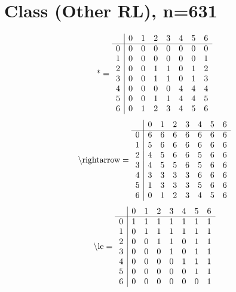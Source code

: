 \documentclass[11pt]{article}
\begin{document}
\section{Class (Other RL), n=631}
\[\text{*} = 
\begin{array}{r | r r r r r r r}
 & 0 & 1 & 2 & 3 & 4 & 5 & 6 \\ \hline
0 & 0 & 0 & 0 & 0 & 0 & 0 & 0 \\
1 & 0 & 0 & 0 & 0 & 0 & 0 & 1 \\
2 & 0 & 0 & 1 & 1 & 0 & 1 & 2 \\
3 & 0 & 0 & 1 & 1 & 0 & 1 & 3 \\
4 & 0 & 0 & 0 & 0 & 4 & 4 & 4 \\
5 & 0 & 0 & 1 & 1 & 4 & 4 & 5 \\
6 & 0 & 1 & 2 & 3 & 4 & 5 & 6 \\
\end{array}
\]
\[\text{\textbackslash rightarrow} = 
\begin{array}{r | r r r r r r r}
 & 0 & 1 & 2 & 3 & 4 & 5 & 6 \\ \hline
0 & 6 & 6 & 6 & 6 & 6 & 6 & 6 \\
1 & 5 & 6 & 6 & 6 & 6 & 6 & 6 \\
2 & 4 & 5 & 6 & 6 & 5 & 6 & 6 \\
3 & 4 & 5 & 5 & 6 & 5 & 6 & 6 \\
4 & 3 & 3 & 3 & 3 & 6 & 6 & 6 \\
5 & 1 & 3 & 3 & 3 & 5 & 6 & 6 \\
6 & 0 & 1 & 2 & 3 & 4 & 5 & 6 \\
\end{array}
\]
\[\text{\textbackslash le} = 
\begin{array}{r | r r r r r r r}
 & 0 & 1 & 2 & 3 & 4 & 5 & 6 \\ \hline
0 & 1 & 1 & 1 & 1 & 1 & 1 & 1 \\
1 & 0 & 1 & 1 & 1 & 1 & 1 & 1 \\
2 & 0 & 0 & 1 & 1 & 0 & 1 & 1 \\
3 & 0 & 0 & 0 & 1 & 0 & 1 & 1 \\
4 & 0 & 0 & 0 & 0 & 1 & 1 & 1 \\
5 & 0 & 0 & 0 & 0 & 0 & 1 & 1 \\
6 & 0 & 0 & 0 & 0 & 0 & 0 & 1 \\
\end{array}
\]
\end{document}
